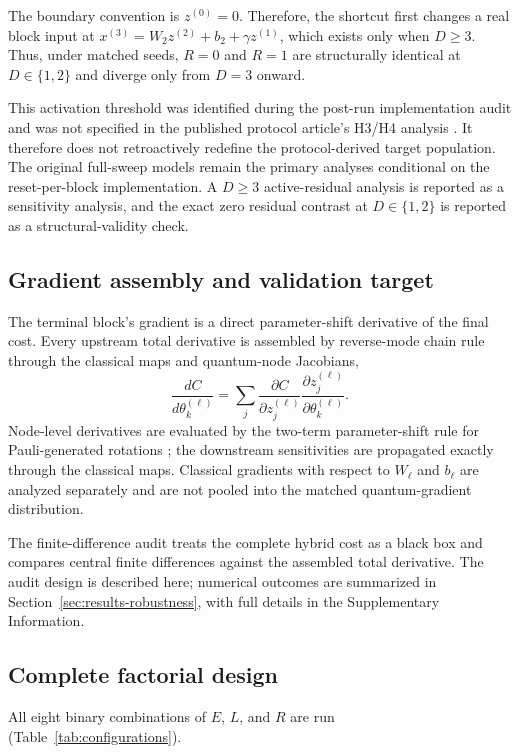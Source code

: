 \documentclass[pdflatex,sn-basic,Numbered]{sn-jnl}
\begin{document}
The boundary convention is $z^{(0)}=0$. Therefore, the shortcut first changes a real block input at $x^{(3)}=W_2z^{(2)}+b_2+\gamma z^{(1)}$, which exists only when $D\ge3$. Thus, under matched seeds, $R=0$ and $R=1$ are structurally identical at $D\in\{1,2\}$ and diverge only from $D=3$ onward.

This activation threshold was identified during the post-run implementation audit and was not specified in the published protocol article's H3/H4 analysis \cite{shen2026gradient}. It therefore does not retroactively redefine the protocol-derived target population. The original full-sweep models remain the primary analyses conditional on the reset-per-block implementation. A $D\ge3$ active-residual analysis is reported as a sensitivity analysis, and the exact zero residual contrast at $D\in\{1,2\}$ is reported as a structural-validity check.

\subsection{Gradient assembly and validation target}

The terminal block's gradient is a direct parameter-shift derivative of the final cost. Every upstream total derivative is assembled by reverse-mode chain rule through the classical maps and quantum-node Jacobians,
\[
\frac{dC}{d\theta_k^{(\ell)}}
=\sum_j
\frac{\partial C}{\partial z_j^{(\ell)}}
\frac{\partial z_j^{(\ell)}}{\partial\theta_k^{(\ell)}}.
\]
Node-level derivatives are evaluated by the two-term parameter-shift rule for Pauli-generated rotations \cite{mitarai2018quantum,schuld2019evaluating}; the downstream sensitivities are propagated exactly through the classical maps. Classical gradients with respect to $W_\ell$ and $b_\ell$ are analyzed separately and are not pooled into the matched quantum-gradient distribution.

The finite-difference audit treats the complete hybrid cost as a black box and compares central finite differences against the assembled total derivative. The audit design is described here; numerical outcomes are summarized in Section~\ref{sec:results-robustness}, with full details in the Supplementary Information.

\subsection{Complete factorial design}

All eight binary combinations of $E$, $L$, and $R$ are run (Table~\ref{tab:configurations}).
\end{document}

